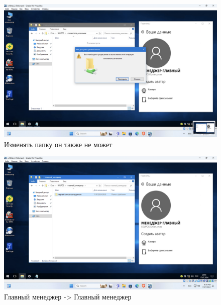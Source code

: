 \begin{figure}[H]
  \centering
  \includegraphics[width=1\textwidth]{pict/prac/46}
  \caption{Изменять папку он также не может}
  \label{fig:45}
\end{figure}

\begin{figure}[H]
  \centering
  \includegraphics[width=1\textwidth]{pict/prac/47}
  \caption{Главный менеджер -> Главный менеджер}
  \label{fig:46}
\end{figure}

